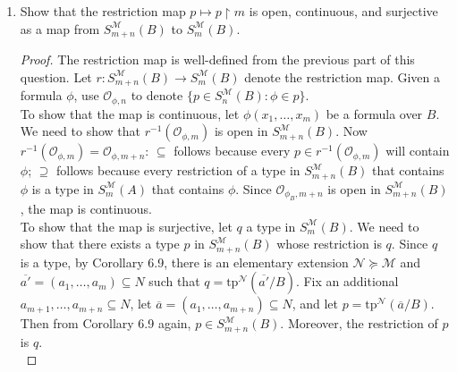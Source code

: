 \documentclass{article}
\begin{document}
\begin{enumerate}[label={\bf Q\arabic*:}]
\begin{enumerate}
      \item Show that the restriction map $p\mapsto p\restriction m$ is
        open, continuous, and surjective as a map from
        $S^{\mathcal{M}}_{m+n}(B)$ to $S^{\mathcal{M}}_{m}(B)$.

        \begin{proof}
          The restriction map is well-defined from the previous part of
          this question. Let $r:S^{\mathcal{M}}_{m+n}(B)\rightarrow
          S^{\mathcal{M}}_{m}(B)$ denote the restriction map. Given a
          formula $\phi$, use $\mathcal{O}_{\phi,n}$ to denote $\{p\in
          S^{\mathcal{M}}_n(B):\phi\in p\}$. \\

          To show that the map is continuous, let $\phi(x_1,\ldots,x_{m})$
          be a formula over $B$. We need to show that
          $r^{-1}(\mathcal{O}_{\phi,m})$ is open in
          $S^{\mathcal{M}}_{m+n}(B)$. Now
          $r^{-1}(\mathcal{O}_{\phi,m})=\mathcal{O}_{\phi,m+n}$:
          $\subseteq$ follows because every $p\in
          r^{-1}(\mathcal{O}_{\phi,m})$ will contain $\phi$; $\supseteq$
          follows because every restriction of a type in
          $S^{\mathcal{M}}_{m+n}(B)$ that contains $\phi$ is a type in
          $S^{\mathcal{M}}_m(A)$ that contains $\phi$. Since
          $\mathcal{O}_{\phi_B,m+n}$ is open in $S^{\mathcal{M}}_{m+n}(B)$,
          the map is continuous. \\

          To show that the map is surjective, let $q$ a type in
          $S^{\mathcal{M}}_{m}(B)$. We need to show that there exists a
          type $p$ in $S^{\mathcal{M}}_{m+n}(B)$ whose restriction is $q$.
          Since $q$ is a type, by Corollary 6.9, there is an elementary
          extension $\mathcal{N}\succeq\mathcal{M}$ and
          $\overline{a'}=(a_1,\ldots,a_m)\subseteq N$ such that
          $q=\text{tp}^\mathcal{N}(\overline{a'}/B)$. Fix an additional
          $a_{m+1},\ldots,a_{m+n}\subseteq N$, let
          $\overline{a}=(a_1,\ldots,a_{m+n})\subseteq N$, and let
          $p=\text{tp}^\mathcal{N}(\overline{a}/B)$. Then from Corollary
          6.9 again, $p\in S^{\mathcal{M}}_{m+n}(B)$. Moreover, the
          restriction of $p$ is $q$. \\


\end{proof}
\end{enumerate}
\end{enumerate}
\end{document}

